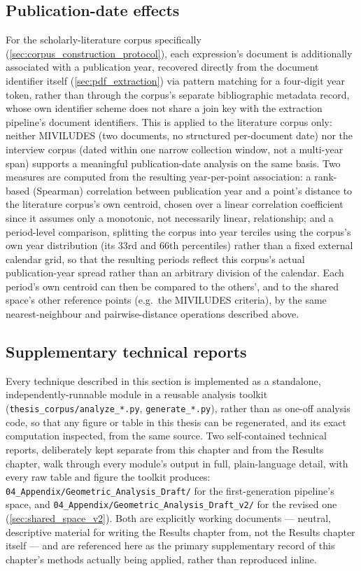 \subsection{Publication-date effects}\label{sec:publication_date_methods}
For the scholarly-literature corpus specifically (\ref{sec:corpus_construction_protocol}), each expression's document is additionally associated with a publication year, recovered directly from the document identifier itself (\ref{sec:pdf_extraction}) via pattern matching for a four-digit year token, rather than through the corpus's separate bibliographic metadata record, whose own identifier scheme does not share a join key with the extraction pipeline's document identifiers. This is applied to the literature corpus only: neither MIVILUDES (two documents, no structured per-document date) nor the interview corpus (dated within one narrow collection window, not a multi-year span) supports a meaningful publication-date analysis on the same basis. Two measures are computed from the resulting year-per-point association: a rank-based (Spearman) correlation between publication year and a point's distance to the literature corpus's own centroid, chosen over a linear correlation coefficient since it assumes only a monotonic, not necessarily linear, relationship; and a period-level comparison, splitting the corpus into year terciles using the corpus's own year distribution (its 33rd and 66th percentiles) rather than a fixed external calendar grid, so that the resulting periods reflect this corpus's actual publication-year spread rather than an arbitrary division of the calendar. Each period's own centroid can then be compared to the others', and to the shared space's other reference points (e.g.\ the MIVILUDES criteria), by the same nearest-neighbour and pairwise-distance operations described above.

\subsection{Supplementary technical reports}
Every technique described in this section is implemented as a standalone, independently-runnable module in a reusable analysis toolkit (\texttt{thesis\_corpus/analyze\_*.py}, \texttt{generate\_*.py}), rather than as one-off analysis code, so that any figure or table in this thesis can be regenerated, and its exact computation inspected, from the same source. Two self-contained technical reports, deliberately kept separate from this chapter and from the Results chapter, walk through every module's output in full, plain-language detail, with every raw table and figure the toolkit produces: \texttt{04\_Appendix/Geometric\_Analysis\_Draft/} for the first-generation pipeline's space, and \texttt{04\_Appendix/Geometric\_Analysis\_Draft\_v2/} for the revised one (\ref{sec:shared_space_v2}). Both are explicitly working documents — neutral, descriptive material for writing the Results chapter from, not the Results chapter itself — and are referenced here as the primary supplementary record of this chapter's methods actually being applied, rather than reproduced inline.
